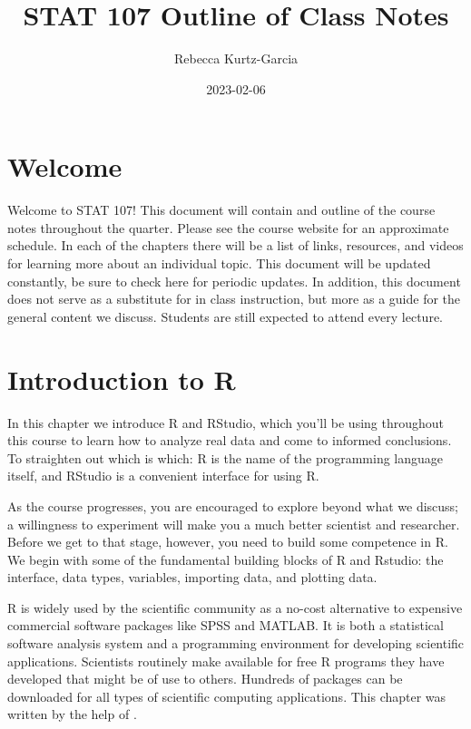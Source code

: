 \documentclass[
]{book}
\title{STAT 107 Outline of Class Notes}
\author{Rebecca Kurtz-Garcia}
\date{2023-02-06}
\begin{document}
\maketitle

{
\setcounter{tocdepth}{1}
\tableofcontents
}
\hypertarget{welcome}{%
\chapter*{Welcome}\label{welcome}}

Welcome to STAT 107! This document will contain and outline of the course notes throughout the quarter. Please see the course website for an approximate schedule. In each of the chapters there will be a list of links, resources, and videos for learning more about an individual topic. This document will be updated constantly, be sure to check here for periodic updates. In addition, this document does not serve as a substitute for in class instruction, but more as a guide for the general content we discuss. Students are still expected to attend every lecture.

\hypertarget{introduction-to-r}{%
\chapter{Introduction to R}\label{introduction-to-r}}

In this chapter we introduce R and RStudio, which you'll be using throughout this course to learn how to analyze real data and come to informed conclusions. To straighten out which is which: R is the name of the programming language itself, and RStudio is a convenient interface for using R.

As the course progresses, you are encouraged to explore beyond what we discuss; a willingness to experiment will make you a much better scientist and researcher. Before we get to that stage, however, you need to build some competence in R. We begin with some of the fundamental building blocks of R and Rstudio: the interface, data types, variables, importing data, and plotting data.

R is widely used by the scientific community as a no-cost alternative to expensive commercial software packages like SPSS and MATLAB. It is both a statistical software analysis system and a programming environment for developing scientific applications. Scientists routinely make available for free R programs they have developed that might be of use to others. Hundreds of packages can be downloaded for all types of scientific computing applications. This chapter was written by the help of \citet{Desharnais2020}.
\end{document}
